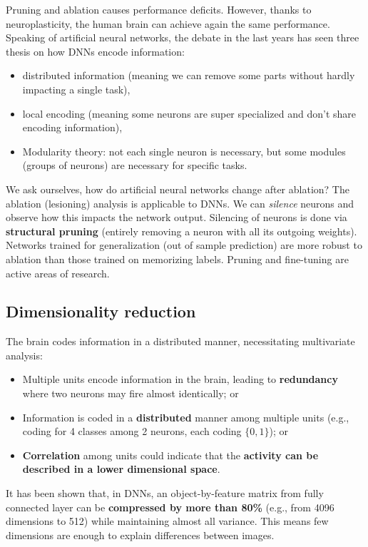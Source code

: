 Pruning and ablation causes performance deficits. However, thanks to neuroplasticity, the human brain can achieve again the same performance.\\

Speaking of artificial neural networks, the debate in the last years has seen three thesis on how DNNs encode information:
\begin{itemize}
    \item distributed information (meaning we can remove some parts without hardly impacting a single task),
    \item local encoding (meaning some neurons are super specialized and don't share encoding information),
    \item Modularity theory: not each single neuron is necessary, but some modules (groups of neurons) are necessary for specific tasks.
\end{itemize}

We ask ourselves, how do artificial neural networks change after ablation?
The ablation (lesioning) analysis is applicable to DNNs. We can \textit{silence} neurons and observe how this impacts the network output. Silencing of neurons is done via \textbf{structural pruning} (entirely removing a neuron with all its outgoing weights).
Networks trained for generalization (out of sample prediction) are more robust to ablation than those trained on memorizing labels. 
Pruning and fine-tuning are active areas of research.

\subsection{Dimensionality reduction}
The brain codes information in a distributed manner, necessitating 
multivariate analysis:
\begin{itemize}
    \item Multiple units encode information in the brain, leading to \textbf{redundancy} where two neurons may fire almost identically; or
    \item Information is coded in a \textbf{distributed} manner among multiple units (e.g., coding for 4 classes among 2 neurons, each coding $\{0,1\}$); or 
    \item \textbf{Correlation} among units could indicate that the \textbf{activity can be described in a lower dimensional space}.
\end{itemize}

It has been shown that, in DNNs, an object-by-feature matrix from fully connected layer can be \textbf{compressed by more than 80\%} (e.g., from 4096 dimensions to 512) while maintaining almost all variance. This means few dimensions are enough to explain differences between images. 

